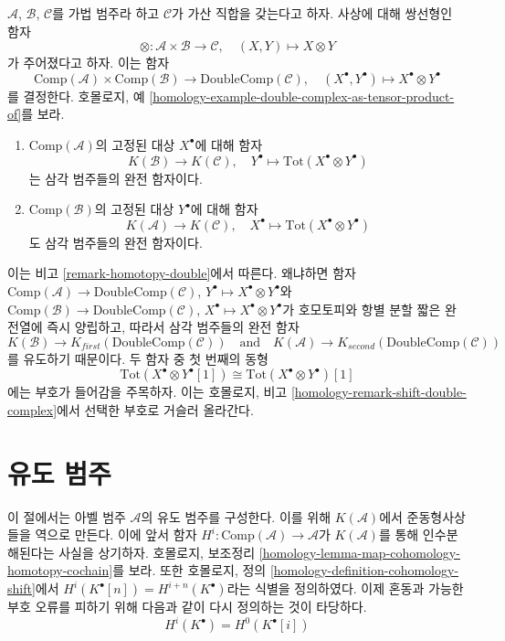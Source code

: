 \begin{remark}
\label{remark-double-complex-as-tensor-product-of}
$\mathcal{A}$, $\mathcal{B}$, $\mathcal{C}$를 가법 범주라 하고
$\mathcal{C}$가 가산 직합을 갖는다고 하자. 사상에 대해 쌍선형인
함자
$$
\otimes : \mathcal{A} \times \mathcal{B} \longrightarrow \mathcal{C},
\quad
(X, Y) \longmapsto X \otimes Y
$$
가 주어졌다고 하자. 이는 함자
$$
\text{Comp}(\mathcal{A}) \times \text{Comp}(\mathcal{B})
\longrightarrow
\text{DoubleComp}(\mathcal{C}), \quad
(X^\bullet, Y^\bullet)
\longmapsto
X^\bullet \otimes Y^\bullet
$$
를 결정한다. 호몰로지, 예
\ref{homology-example-double-complex-as-tensor-product-of}를 보라.
\begin{enumerate}
\item $\text{Comp}(\mathcal{A})$의 고정된 대상 $X^\bullet$에 대해
함자
$$
K(\mathcal{B}) \longrightarrow K(\mathcal{C}), \quad
Y^\bullet \longmapsto \text{Tot}(X^\bullet \otimes Y^\bullet)
$$
는 삼각 범주들의 완전 함자이다.
\item $\text{Comp}(\mathcal{B})$의 고정된 대상 $Y^\bullet$에 대해
함자
$$
K(\mathcal{A}) \longrightarrow K(\mathcal{C}), \quad
X^\bullet \longmapsto \text{Tot}(X^\bullet \otimes Y^\bullet)
$$
도 삼각 범주들의 완전 함자이다.
\end{enumerate}
이는 비고 \ref{remark-homotopy-double}에서 따른다. 왜냐하면
함자
$\text{Comp}(\mathcal{A}) \to \text{DoubleComp}(\mathcal{C})$,
$Y^\bullet \mapsto X^\bullet \otimes Y^\bullet$와
$\text{Comp}(\mathcal{B}) \to \text{DoubleComp}(\mathcal{C})$,
$X^\bullet \mapsto X^\bullet \otimes Y^\bullet$가 호모토피와
항별 분할 짧은 완전열에 즉시 양립하고, 따라서 삼각 범주들의
완전 함자
$$
K(\mathcal{B}) \to K_{first}(\text{DoubleComp}(\mathcal{C}))
\quad\text{and}\quad
K(\mathcal{A}) \to K_{second}(\text{DoubleComp}(\mathcal{C}))
$$
를 유도하기 때문이다. 두 함자 중 첫 번째의 동형
$$
\text{Tot}(X^\bullet \otimes Y^\bullet[1]) \cong
\text{Tot}(X^\bullet \otimes Y^\bullet)[1]
$$
에는 부호가 들어감을 주목하자. 이는 호몰로지, 비고
\ref{homology-remark-shift-double-complex}에서 선택한 부호로
거슬러 올라간다.
\end{remark}


\section{유도 범주}
\label{section-derived-categories}

\noindent
이 절에서는 아벨 범주 $\mathcal{A}$의 유도 범주를 구성한다. 이를 위해
$K(\mathcal{A})$에서 준동형사상들을 역으로 만든다.
이에 앞서 함자
$H^i : \text{Comp}(\mathcal{A}) \to \mathcal{A}$가
$K(\mathcal{A})$를 통해 인수분해된다는 사실을 상기하자. 호몰로지,
보조정리 \ref{homology-lemma-map-cohomology-homotopy-cochain}를 보라.
또한 호몰로지, 정의
\ref{homology-definition-cohomology-shift}에서
$H^i(K^\bullet[n]) = H^{i + n}(K^\bullet)$라는 식별을 정의하였다.
이제 혼동과 가능한 부호 오류를 피하기 위해 다음과 같이 다시 정의하는 것이
타당하다.
$$
H^i(K^\bullet) = H^0(K^\bullet[i])
$$

